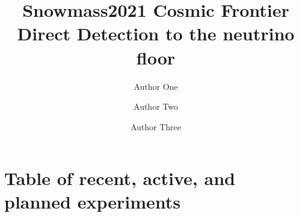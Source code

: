 \documentclass[12pt]{article}
\title{Snowmass2021 Cosmic Frontier \\ Direct Detection to the neutrino floor}
\date{}
\author[1]{Author One}
\author[1,2]{Author Two}
\author[3]{Author Three}
\affil[1]{Affiliation One}
\affil[2]{Affiliation Two}
\affil[3]{Affiliation Three}
\begin{document}
\maketitle



\tableofcontents








\appendix
\section{Table of recent, active, and planned experiments}




\end{document}
